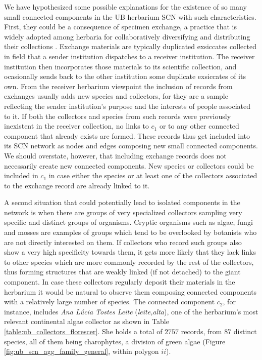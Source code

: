 We have hypothesized some possible explanations for the existence of so many small connected components in the UB herbarium SCN with such characteristics. First, they could be a consequence of specimen exchange, a practice that is widely adopted among herbaria for collaboratively diversifying and distributing their collections \cite{Groom2014}. Exchange materials are typically duplicated exsiccates collected in field that a sender institution dispatches to a receiver institution. The receiver institution then incorporates those materials to its scientific collection, and ocasionally sends back to the other institution some duplicate exsiccates of its own.
From the receiver herbarium viewpoint the inclusion of records from exchanges usually adds new species and collectors, for they are a sample reflecting the sender institution's purpose and the interests of people associated to it. If both the collectors and species from such records were previously inexistent in the receiver collection, no links to $c_1$ or to any other connected component that already exists are formed. These records thus get included into its SCN network as nodes and edges composing new small connected components. We should overstate, however, that including exchange records does not necessarily create new connected components. New species or collectors could be included in $c_1$ in case either the species or at least one of the collectors associated to the exchange record are already linked to it.

A second situation that could potentially lead to isolated components in the network is when there are groups of very specialized collectors sampling very specific and distinct groups of organisms. 
Cryptic organisms such as algae, fungi and mosses are examples of groups which tend to be overlooked by botanists who are not directly interested on them. 
If collectors who record such groups also show a very high specificity towards them, it gets more likely that they lack links to other species which are more commonly recorded by the rest of the collectors, thus forming structures that are weakly linked (if not detached) to the giant component. 
In case these collectors regularly deposit their materials in the herbarium it would be natural to observe them composing connected components with a relatively large number of species.
The connected component $c_2$, for instance, includes \textit{Ana Lúcia Tostes Leite} (\textit{leite,alta}), one of the herbarium's most relevant continental algae collector as shown in Table \ref{table:ub_collectors_florescer}.
She holds a total of $2757$ records, from $87$ distinct species, all of them being charophytes, a division of green algae (Figure \ref{fig:ub_scn_agg_family_general}, within polygon $ii$).



